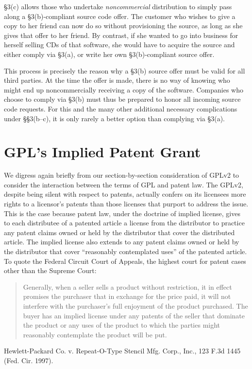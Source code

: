 \S 3(c) allows those who undertake \emph{noncommercial} distribution to
simply pass along a \S 3(b)-compliant source code offer. The customer who
wishes to give a copy to her friend can now do so without provisioning the
source, as long as she gives that offer to her friend. By contrast, if
she wanted to go into business for herself selling CDs of that software,
she would have to acquire the source and either comply via \S 3(a), or
write her own \S 3(b)-compliant source offer.

This process is precisely the reason why a \S 3(b) source offer must be
valid for all third parties. At the time the offer is made, there is no
way of knowing who might end up noncommercially receiving a copy of the
software. Companies who choose to comply via \S 3(b) must thus be
prepared to honor all incoming source code requests. For this and the
many other additional necessary complications under \S\S 3(b--c), it is
only rarely a better option than complying via \S 3(a).

\chapter{GPL's Implied Patent Grant}

We digress again briefly from our section-by-section consideration of GPLv2
to consider the interaction between the terms of GPL and patent law. The
GPLv2, despite being silent with respect to patents, actually confers on its
licensees more rights to a licensor's patents than those licenses that
purport to address the issue. This is the case because patent law, under
the doctrine of implied license, gives to each distributee of a patented
article a license from the distributor to practice any patent claims owned
or held by the distributor that cover the distributed article. The
implied license also extends to any patent claims owned or held by the
distributor that cover ``reasonably contemplated uses'' of the patented
article. To quote the Federal Circuit Court of Appeals, the highest court
for patent cases other than the Supreme Court:

\begin{quotation}
Generally, when a seller sells a product without restriction, it in
effect promises the purchaser that in exchange for the price paid, it will
not interfere with the purchaser's full enjoyment of the product
purchased. The buyer has an implied license under any patents of the
seller that dominate the product or any uses of the product to which the
parties might reasonably contemplate the product will be put.
\end{quotation}
Hewlett-Packard Co. v. Repeat-O-Type Stencil Mfg. Corp., Inc., 123 F.3d
1445 (Fed. Cir. 1997).

